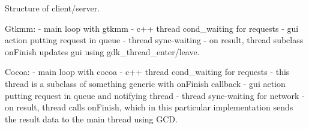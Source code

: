 
Structure of client/server.


Gtkmm:
  - main loop with gtkmm
  - c++ thread cond_waiting for requests
  - gui action putting request in queue
  - thread sync-waiting
  - on result, thread subclass onFinish updates gui using
    gdk_thread_enter/leave.


Cocoa:
  - main loop with cocoa
  - c++ thread cond_waiting for requests
  - this thread is a subclass of something generic with onFinish callback
  - gui action putting request in queue and notifying thread
  - thread sync-waiting for network
  - on result, thread calls onFinish, which in this particular
    implementation sends the result data to the main thread using
    GCD.

 
